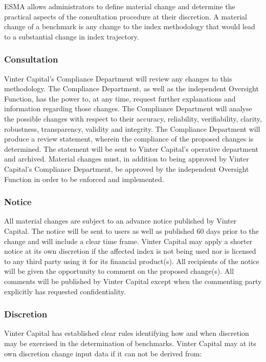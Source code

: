 \documentclass{article}
\begin{document}
ESMA allows administrators to define material change and determine the
practical aspects of the consultation procedure at their discretion. A
material change of a benchmark is any change to the index methodology
that would lead to a substantial change in index trajectory.

\subsubsection{Consultation}\label{consultation}

Vinter Capital's Compliance Department will review any changes to this
methodology. The Compliance Department, as well as the independent
Oversight Function, has the power to, at any time, request further
explanations and information regarding those changes. The Compliance
Department will analyse the possible changes with respect to their
accuracy, reliability, verifiability, clarity, robustness, transparency,
validity and integrity. The Compliance Department will produce a review
statement, wherein the compliance of the proposed changes is determined.
The statement will be sent to Vinter Capital's operative department and
archived. Material changes must, in addition to being approved by Vinter
Capital's Compliance Department, be approved by the independent
Oversight Function in order to be enforced and implemented.

\subsubsection{Notice}\label{notice}

All material changes are subject to an advance notice published by
Vinter Capital. The notice will be sent to users as well as published 60
days prior to the change and will include a clear time frame. Vinter
Capital may apply a shorter notice at its own discretion if the affected
index is not being used nor is licensed to any third party using it for
its financial product(s). All recipients of the notice will be given the
opportunity to comment on the proposed change(s). All comments will be
published by Vinter Capital except when the commenting party explicitly
has requested confidentiality.

\subsubsection{Discretion}\label{discretion}

Vinter Capital has established clear rules identifying how and when
discretion may be exercised in the determination of benchmarks. Vinter
Capital may at its own discretion change input data if it can not be
derived from:
\end{document}

